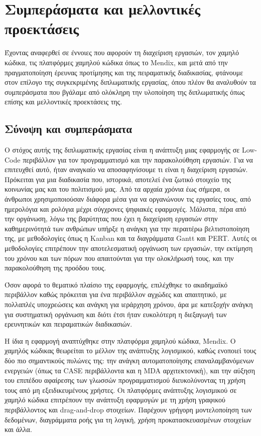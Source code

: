 \chapter{Συμπεράσματα και μελλοντικές προεκτάσεις}
    Έχοντας αναφερθεί σε έννοιες που αφορούν τη διαχείριση εργασιών, τον χαμηλό κώδικα, τις πλατφόρμες χαμηλού κώδικα όπως το Mendix, και μετά από την πραγματοποίηση έρευνας προτίμησης και της πειραματικής διαδικασίας, φτάνουμε στον επίλογο της συγκεκριμένης διπλωματικής εργασίας, όπου πλέον θα αναλυθούν τα συμπεράσματα που βγάλαμε από ολόκληρη την υλοποίηση της διπλωματικής όπως επίσης και μελλοντικές προεκτάσεις της.

    \section{Σύνοψη και συμπεράσματα}
        Ο στόχος αυτής της διπλωματικής εργασίας είναι η ανάπτυξη μιας εφαρμογής σε Low-Code περιβάλλον για τον προγραμματισμό και την παρακολούθηση εργασιών. Για να επιτευχθεί αυτό, ήταν αναγκαίο να αποσαφηνίσουμε τι είναι η διαχείριση εργασιών. Πρόκειται για μια διαδικασία που, ιστορικά, αποτελεί ένα ζωτικό στοιχείο της κοινωνίας μας και του πολιτισμού μας. Από τα αρχαία χρόνια έως σήμερα, οι άνθρωποι χρησιμοποιούσαν διάφορα μέσα για να οργανώνουν τις εργασίες τους, από ημερολόγια και ρολόγια μέχρι σύγχρονες ψηφιακές εφαρμογές. Μάλιστα, πέρα από την οργάνωση, λόγω της βαρύτητας που έχει η διαχείριση εργασιών στην καθημερινότητά των ανθρώπων υπήρξε η ανάγκη για την περαιτέρω βελτιστοποίηση της, με μεθοδολογίες όπως η Kanban και τα διαγράμματα Gantt και PERT. Αυτές οι μεθοδολογίες επιτρέπουν την αποτελεσματική οργάνωση των εργασιών, την εκτίμηση του χρόνου και των πόρων που απαιτούνται για την ολοκλήρωσή τους, και την παρακολούθηση της προόδου τους.

        Όσον αφορά το θεματικό πλαίσιο της εφαρμογής, επιλέχθηκε το ακαδημαϊκό περιβάλλον καθώς πρόκειται για ένα περιβάλλον αγχώδες και απαιτητικό, με πολλαπλές υποχρεώσεις και ανάγκη για ιεράρχηση χρόνου, άρα με κατεξοχήν ανάγκη για συστηματική οργάνωση και διότι έτσι ήταν ευκολότερη η διεξαγωγή των ερευνητικών και πειραματικών διαδικασιών.

        Η ίδια η εφαρμογή αναπτύχθηκε στην πλατφόρμα χαμηλού κώδικα, Mendix. Ο χαμηλός κώδικας θεωρείται το μέλλον της ανάπτυξης λογισμικού, καθώς ενοποιεί τους δύο πιο σημαντικούς πυλώνες της: την ανάγκη αυτοματοποίησης επαναλαμβανόμενων ενεργειών (όπως τα CASE περιβάλλοντα και η MDA αρχιτεκτονική), και την αύξηση του επιπέδου αφαίρεσης των γλωσσών προγραμματισμού διευκολύνοντας τη χρήση τους από μη εξειδικευμένους χρήστες. Οι πλατφόρμες ανάπτυξης λογισμικού σε χαμηλό κώδικα επιτρέπουν την ανάπτυξη εφαρμογών με τη χρήση γραφικού περιβάλλοντος και drag-and-drop στοιχείων. Παρέχουν γρήγορη μοντελοποίηση των δεδομένων, διαγράμματα ροής για τη λογική, χρήση προκατασκευασμένων στοιχείων και άλλα.

